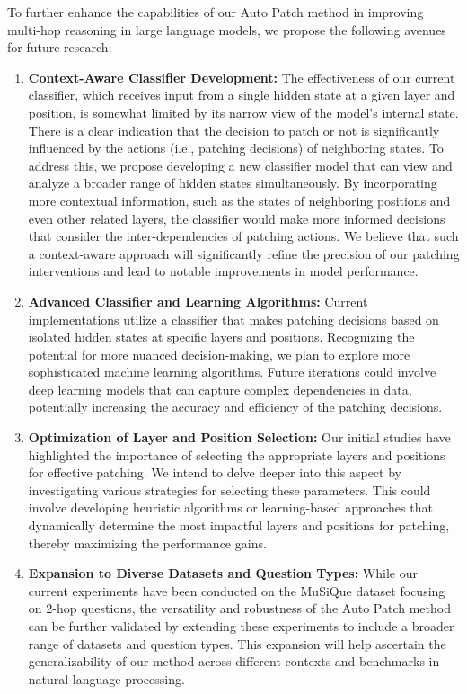 \documentclass[11pt]{article}
\begin{document}
To further enhance the capabilities of our Auto Patch method in improving multi-hop reasoning in large language models, we propose the following avenues for future research:

\begin{enumerate}
    \item \textbf{Context-Aware Classifier Development:} The effectiveness of our current classifier, which receives input from a single hidden state at a given layer and position, is somewhat limited by its narrow view of the model's internal state. There is a clear indication that the decision to patch or not is significantly influenced by the actions (i.e., patching decisions) of neighboring states. To address this, we propose developing a new classifier model that can view and analyze a broader range of hidden states simultaneously. By incorporating more contextual information, such as the states of neighboring positions and even other related layers, the classifier would make more informed decisions that consider the inter-dependencies of patching actions. We believe that such a context-aware approach will significantly refine the precision of our patching interventions and    lead to notable improvements in model performance.
    
    \item \textbf{Advanced Classifier and Learning Algorithms:} Current implementations utilize a classifier that makes patching decisions based on isolated hidden states at specific layers and positions. Recognizing the potential for more nuanced decision-making, we plan to explore more sophisticated machine learning algorithms. Future iterations could involve deep learning models that can capture complex dependencies in data, potentially increasing the accuracy and efficiency of the patching decisions.

    \item \textbf{Optimization of Layer and Position Selection:} Our initial studies have highlighted the importance of selecting the appropriate layers and positions for effective patching. We intend to delve deeper into this aspect by investigating various strategies for selecting these parameters. This could involve developing heuristic algorithms or learning-based approaches that dynamically determine the most impactful layers and positions for patching, thereby maximizing the performance gains.

    \item \textbf{Expansion to Diverse Datasets and Question Types:} While our current experiments have been conducted on the MuSiQue dataset focusing on 2-hop questions, the versatility and robustness of the Auto Patch method can be further validated by extending these experiments to include a broader range of datasets and question types. This expansion will help ascertain the generalizability of our method across different contexts and benchmarks in natural language processing.

  
\end{enumerate}



\end{document}
